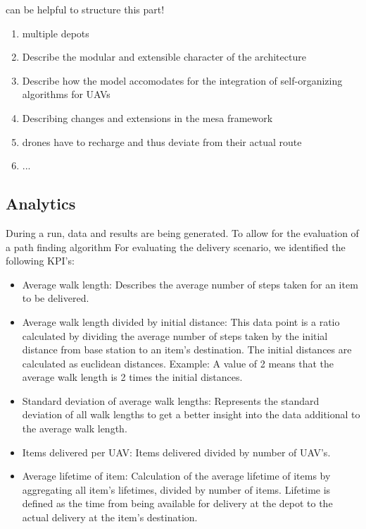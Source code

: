\cite{jang.2005} can be helpful to structure this part!


\begin{enumerate}
	\item multiple depots
	\item Describe the modular and extensible character of the architecture
	\item Describe how the model accomodates for the integration of self-organizing algorithms for UAVs
	\item Describing changes and extensions in the mesa framework
	\item drones have to recharge and thus deviate from their actual route
	\item ...
	
\end{enumerate}


\subsection{Analytics}\label{sec:KPI}
During a run, data and results are being generated. To allow for the evaluation of a path finding algorithm
For evaluating the delivery scenario, we identified the following KPI's:
\begin{itemize}
	\item Average walk length: Describes the average number of steps taken for an item to be delivered. 
	\item Average walk length divided by initial distance: This data point is a ratio calculated by dividing the average number of steps taken by the initial distance from base station to an item's destination. The initial distances are calculated as euclidean distances. Example: A value of 2 means that the average walk length is 2 times the initial distances.
	\item Standard deviation of average walk lengths: Represents the standard deviation of all walk lengths to get a better insight into the data additional to the average walk length.
	\item Items delivered per UAV: Items delivered divided by number of UAV's.
	\item Average lifetime of item: Calculation of the average lifetime of items by aggregating all item's lifetimes, divided by number of items. Lifetime is defined as the time from being available for delivery at the depot to the actual delivery at the item's destination.
\end{itemize}

